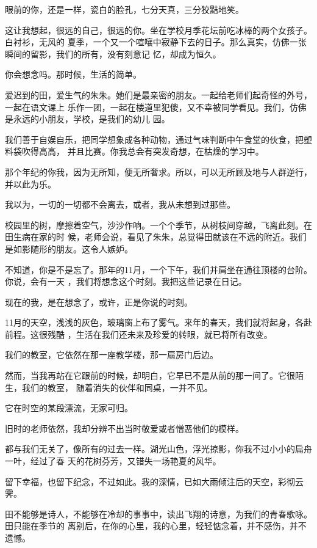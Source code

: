 \documentclass[12pt,a4paper]{article}
\begin{document}
	\endwriting



		眼前的你，还是一样，瓷白的脸孔，七分天真，三分狡黠地笑。

		这让我想起，很远的自己，很远的你。坐在学校月季花坛前吃冰棒的两个女孩子。白衬衫，无风的
	夏季，一个又一个喧嚷中寂静下去的日子。那么真实，仿佛一张瞬间的留影，我们的所有，没有刻意记
	忆，却成为恒久。


		你会想念吗。那时候，生活的简单。

		爱迟到的田，爱生气的朱朱。她们是最亲密的朋友。一起给老师们起奇怪的外号，一起在语文课上
	乐作一团，一起在楼道里犯傻，又不幸被同学看见。我们，仿佛是永远的小朋友，学校，是我们的幼儿
	园。

		我们善于自娱自乐，把同学想象成各种动物，通过气味判断中午食堂的伙食，把塑料袋吹得高高，
	并且比赛。你我总会有突发奇想，在枯燥的学习中。


		那个年纪的你我，因为无所知，便无所奢求。所以，可以无所顾及地与人群逆行，并以此为乐。

		我以为，一切的一切都不会离去，或者，我从未想到过那些。


		校园里的树，摩擦着空气，沙沙作响。一个个季节，从树枝间穿越，飞离此刻。在田生病在家的时
	候，老师会说，看见了朱朱，总觉得田就该在不远的附近。我们是如影随形的朋友。这令人嫉妒。

		不知道，你是不是忘了。那年的11月，一个下午，我们并肩坐在通往顶楼的台阶。你说，会有一天
	，我们将想念这个时刻。我把这些记录在日记。


		现在的我，是在想念了，或许，正是你说的时刻。

		11月的天空，浅浅的灰色，玻璃窗上布了雾气。来年的春天，我们就将起身，各赴前程。这很残酷
	，生活在我们还未来及珍爱的转眼，就已将所有改变。


		我们的教室，它依然在那一座教学楼，那一扇房门后边。

		然而，当我再站在它跟前的时候，却明白，它早已不是从前的那一间了。它很陌生，我们的教室，
	随着消失的伙伴和同桌，一并不见。

		它在时空的某段漂流，无家可归。

		旧时的老师依然，我却分辨不出当时敬爱或者憎恶他们的模样。


		都与我们无关了，像所有的过去一样。湖光山色，浮光掠影，你我不过小小的扁舟一叶，经过了春
	天的花树芬芳，又错失一场艳夏的风华。


		留下幸福，也留下纪念，不过如此。我的深情，已如大雨倾注后的天空，彩彻云霁。

		田不能够是诗人，不能够在冷却的事事中，读出飞翔的诗意，为我们的青春歌咏。田只能在季节的
	离别后，在你的心里，我的心里，轻轻惦念着，并不感伤，并不遗憾。
\end{document}
